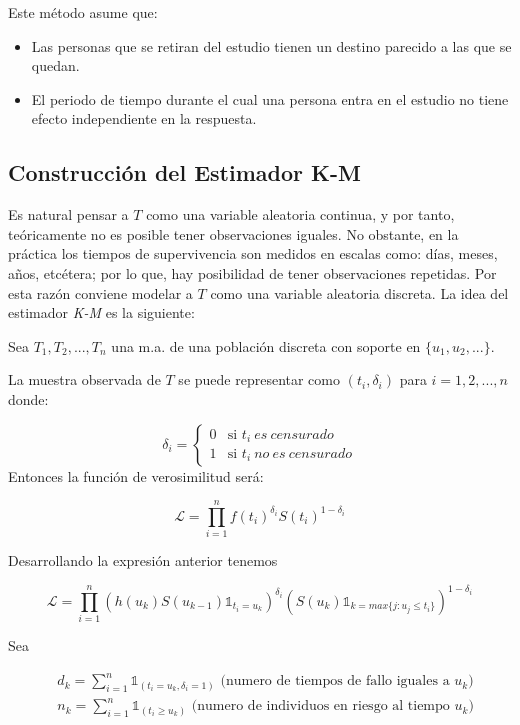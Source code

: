 \documentclass[
  a4paper,
  oneside,
  openany]{book}
\providecommand{\tightlist}{%
  \setlength{\itemsep}{0pt}\setlength{\parskip}{0pt}}
\begin{document}
Este método asume que:

\begin{itemize}
\tightlist
\item
  Las personas que se retiran del estudio tienen un destino parecido a las que se quedan.
\item
  El periodo de tiempo durante el cual una persona entra en el estudio no tiene efecto independiente en la respuesta.
\end{itemize}

\hypertarget{construcciuxf3n-del-estimador-k-m}{%
\subsection{Construcción del Estimador K-M}\label{construcciuxf3n-del-estimador-k-m}}

Es natural pensar a \(T\) como una variable aleatoria continua, y por tanto, teóricamente no es posible tener observaciones iguales. No obstante, en la práctica los tiempos de supervivencia son medidos en escalas como: días, meses, años, etcétera; por lo que, hay posibilidad de tener observaciones repetidas. Por esta razón conviene modelar a \(T\) como una variable aleatoria discreta. La idea del estimador \emph{K-M} es la siguiente:

Sea \(T_{1}, T_{2},...,T_{n}\) una m.a. de una población discreta con soporte en \(\{u_{1}, u_{2},...\}\).

La muestra observada de \(T\) se puede representar como \((t_{i},\delta_{i})\) para \(i=1,2,...,n\) donde:

\[
\delta_{i} = \left\{
\begin{array}{ll}
0 & \mbox{si }  t_i \ es \ censurado\\
1 & \mbox{si }  t_{i} \ no \ es \ censurado
\end{array}
\right.
\]
Entonces la función de verosimilitud será:

\[ 
\mathscr{L} = \prod^{n}_{i=1}f(t_{i})^{\delta_{i}}S(t_{i})^{1-\delta_{i}} 
\]

Desarrollando la expresión anterior tenemos

\[
\mathscr{L} =\prod^{n}_{i=1}(h(u_{k})S(u_{k-1})\mathbb{1}_{t_{i}=u_{k}})^{\delta_{i}} (S(u_{k})\mathbb{1}_{k=max\{j:u_{j}\leq t_i\}})^{1-\delta_{i}}
\]

Sea

\[
\begin{split}
 & d_{k} = \sum_{i=1}^{n}\mathbb{1}_{(t_{i}=u_{k},\delta_{i}=1)} \mbox{  (numero de tiempos de fallo iguales a }u_{k}) \\
 & n_{k} = \sum_{i=1}^{n}\mathbb{1}_{(t_{i}\geq{u_{k}})} \mbox{ (numero de individuos en riesgo al tiempo } u_{k})
\end{split}
\]
\end{document}
